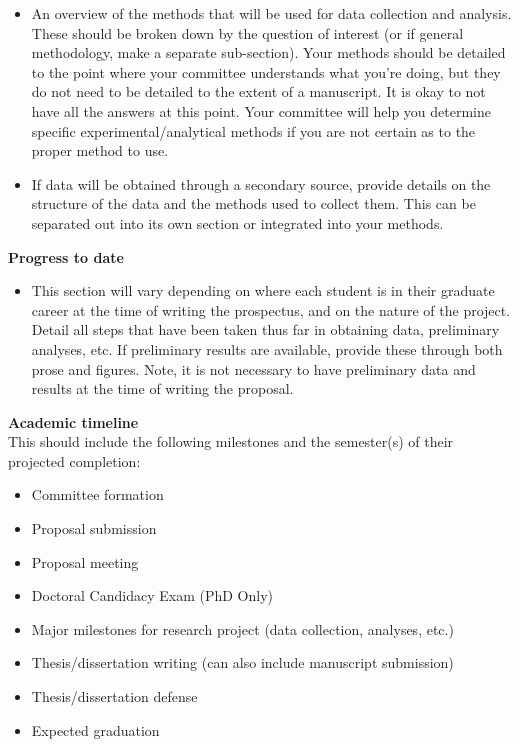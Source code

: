 \documentclass[
]{article}
\providecommand{\tightlist}{%
  \setlength{\itemsep}{0pt}\setlength{\parskip}{0pt}}
\begin{document}
\begin{itemize}
\tightlist
\item
  An overview of the methods that will be used for data collection and analysis. These should be broken down by the question of interest (or if general methodology, make a separate sub-section). Your methods should be detailed to the point where your committee understands what you're doing, but they do not need to be detailed to the extent of a manuscript. It is okay to not have all the answers at this point. Your committee will help you determine specific experimental/analytical methods if you are not certain as to the proper method to use.
\item
  If data will be obtained through a secondary source, provide details on the structure of the data and the methods used to collect them. This can be separated out into its own section or integrated into your methods.
\end{itemize}

\textbf{Progress to date}

\begin{itemize}
\tightlist
\item
  This section will vary depending on where each student is in their graduate career at the time of writing the prospectus, and on the nature of the project. Detail all steps that have been taken thus far in obtaining data, preliminary analyses, etc. If preliminary results are available, provide these through both prose and figures. Note, it is not necessary to have preliminary data and results at the time of writing the proposal.
\end{itemize}

\textbf{Academic timeline}\\
This should include the following milestones and the semester(s) of their projected completion:

\begin{itemize}
\tightlist
\item
  Committee formation
\item
  Proposal submission
\item
  Proposal meeting
\item
  Doctoral Candidacy Exam (PhD Only)
\item
  Major milestones for research project (data collection, analyses, etc.)
\item
  Thesis/dissertation writing (can also include manuscript submission)
\item
  Thesis/dissertation defense
\item
  Expected graduation
\end{itemize}
\end{document}
